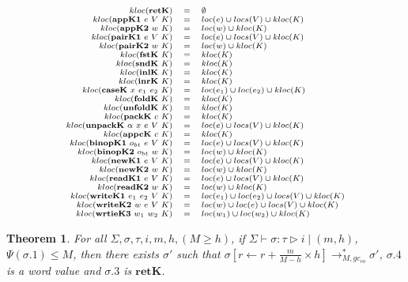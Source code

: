 \documentclass[fleqn]{article}
\newtheorem{theorem}{Theorem}
\begin{document}
\[
\scriptsize
\begin{array}{rcl}
	kloc(\mathbf{retK}) & = & \emptyset \\
	kloc(\mathbf{appK1}~e~V~K) & = & loc(e) \cup locs(V) \cup kloc(K) \\
	kloc(\mathbf{appK2}~w~K) & = & loc(w) \cup kloc(K) \\
	kloc(\mathbf{pairK1}~e~V~K) & = & loc(e) \cup locs(V) \cup kloc(K) \\
	kloc(\mathbf{pairK2}~w~K) & = & loc(w) \cup kloc(K) \\
	kloc(\mathbf{fstK}~K) & = & kloc(K) \\
	kloc(\mathbf{sndK}~K) & = & kloc(K) \\
	kloc(\mathbf{inlK}~K) & = & kloc(K) \\
	kloc(\mathbf{inrK}~K) & = & kloc(K) \\
	kloc(\mathbf{caseK}~x~e_1~e_2~K) & = & loc(e_1) \cup loc(e_2) \cup kloc(K) \\
	kloc(\mathbf{foldK}~K) & = & kloc(K) \\
	kloc(\mathbf{unfoldK}~K) & = & kloc(K) \\
	kloc(\mathbf{packK}~c~K) & = & kloc(K) \\
	kloc(\mathbf{unpackK}~\alpha~x~e~V~K) & = & loc(e) \cup locs(V) \cup kloc(K) \\
	kloc(\mathbf{appcK}~c~K) & = & kloc(K) \\
	kloc(\mathbf{binopK1}~o_{bt}~e~V~K) & = & loc(e) \cup locs(V) \cup kloc(K) \\
	kloc(\mathbf{binopK2}~o_{bt}~w~K) & = & loc(w) \cup kloc(K) \\
	kloc(\mathbf{newK1}~e~V~K) & = & loc(e) \cup locs(V) \cup kloc(K) \\
	kloc(\mathbf{newK2}~w~K) & = & loc(w) \cup kloc(K) \\
	kloc(\mathbf{readK1}~e~V~K) & = & loc(e) \cup locs(V) \cup kloc(K) \\
	kloc(\mathbf{readK2}~w~K) & = & loc(w) \cup kloc(K) \\
	kloc(\mathbf{writeK1}~e_1~e_2~V~K) & = & loc(e_1) \cup loc(e_2) \cup locs(V) \cup kloc(K) \\
	kloc(\mathbf{writeK2}~w~e~V~K) & = & loc(w) \cup loc(e) \cup locs(V) \cup kloc(K) \\
	kloc(\mathbf{wrtieK3}~w_1~w_2~K) & = & loc(w_1) \cup loc(w_2) \cup kloc(K)
\end{array}
\]

\begin{theorem}
	For all $\Sigma,\sigma,\tau,i,m,h,(M \ge h)$, if $\Sigma \vdash \sigma : \tau \triangleright i \mid (m,h)$, $\Psi(\sigma.1) \le M$,
	then there exists $\sigma'$ such that $\sigma[r \leftarrow r+ \frac{m}{M-h}\times h] \longrightarrow_{M,gc_{co}}^* \sigma'$,
	$\sigma.4$ is a word value and $\sigma.3$ is $\mathbf{retK}$.
\end{theorem}
\end{document}
